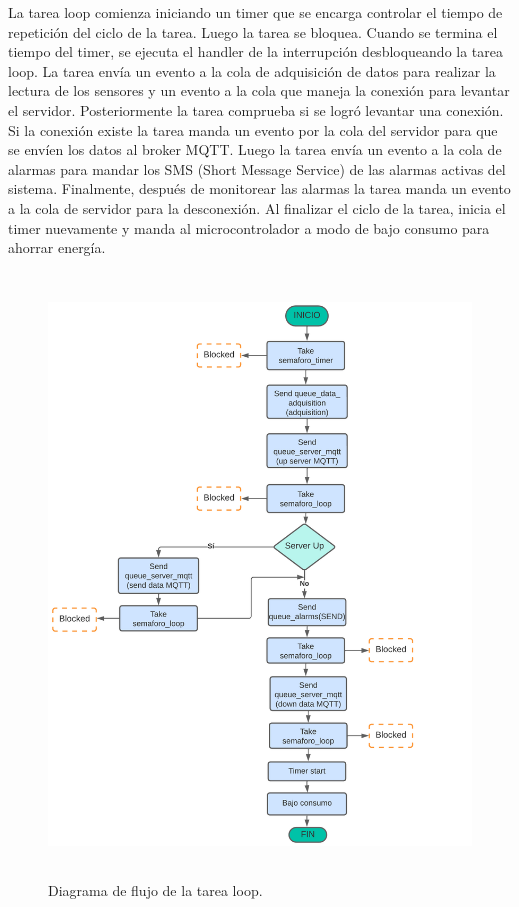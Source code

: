 La tarea loop comienza iniciando un timer que se encarga controlar el tiempo de repetición del ciclo de la tarea. Luego la tarea se bloquea. 
Cuando se termina el tiempo del timer, se ejecuta el handler de la interrupción desbloqueando la tarea loop. La tarea envía un evento a la cola de adquisición de datos para realizar la lectura  de  los sensores y un evento a la cola que maneja la conexión  para levantar el servidor. Posteriormente la tarea comprueba si se logró levantar una conexión. Si la conexión existe la tarea manda un evento  por la cola del servidor para que se envíen los datos al broker MQTT. Luego la tarea  envía un evento a la cola de alarmas para mandar los SMS (Short Message Service) de las alarmas activas del sistema. Finalmente, después de monitorear  las alarmas la tarea manda un evento a la cola de servidor para la desconexión. Al finalizar el ciclo de la tarea, inicia el timer nuevamente y manda al microcontrolador a modo de bajo consumo para ahorrar energía.

\begin{figure}[h]  
\centering
	\includegraphics[width=12cm, height=16cm]{./Figures/DF task loop.png}
	\caption{Diagrama de flujo de la tarea loop.}
	\label{fig:Df tarea loop sistema}
\end{figure}

